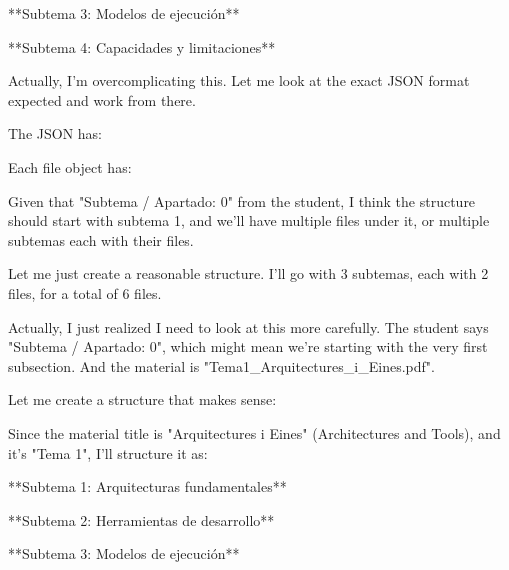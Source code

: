 **Subtema 3: Modelos de ejecución**

**Subtema 4: Capacidades y limitaciones**

Actually, I'm overcomplicating this. Let me look at the exact JSON format expected and work from there.

The JSON has:

Each file object has:

Given that "Subtema / Apartado: 0" from the student, I think the structure should start with subtema 1, and we'll have multiple files under it, or multiple subtemas each with their files.

Let me just create a reasonable structure. I'll go with 3 subtemas, each with 2 files, for a total of 6 files.

Actually, I just realized I need to look at this more carefully. The student says "Subtema / Apartado: 0", which might mean we're starting with the very first subsection. And the material is "Tema1\_Arquitectures\_i\_Eines.pdf".

Let me create a structure that makes sense:

Since the material title is "Arquitectures i Eines" (Architectures and Tools), and it's "Tema 1", I'll structure it as:

**Subtema 1: Arquitecturas fundamentales**

**Subtema 2: Herramientas de desarrollo**

**Subtema 3: Modelos de ejecución**

